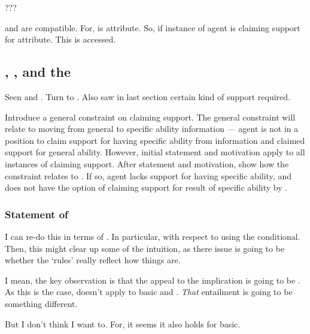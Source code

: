 \begin{note}[Summarising]
  ???
\end{note}

\begin{note}
  \AR{} and \ESU{} are compatible.
  For, \AR{} is attribute.
  So, if instance of \AR{} agent is claiming support for attribute.
  This is accessed.
\end{note}

\subsection{\nI{}, \gsi{}, and the \aben{}}
\label{sec:second-conditional}

\begin{note}
  Seen \ESU{} and \WR{}.
  Turn to \AR{}.
  Also saw in last section certain kind of support required.

  Introduce a general constraint on claiming support.
  The general constraint will relate to moving from general to specific ability information --- agent is not in a position to claim support for having specific ability from information and claimed support for general ability.
  However, initial statement and motivation apply to all instances of claiming support.
  After statement and motivation, show how the constraint relates to \AR{}.
  If so, agent lacks support for having specific ability, and does not have the option of claiming support for result of specific ability by \AR{}.
\end{note}

\subsubsection{Statement of \nI{}}
\label{sec:ni-1}

{
  \color{red}
  I can re-do this in terms of \nr{}.
  In particular, \nr{} with respect to using the conditional.
  Then, this might clear up some of the intuition, as there issue is going to be whether the `rules' really reflect how things are.

  I mean, the key observation is that the appeal to the implication is going to be \nr{}.
  As this is the case, \nI{} doesn't apply to basic\AR{} and \ur{}.
  \emph{That} entailment is going to be something different.

  But I don't think I want to.
  For, it seems it also holds for basic\AR{}.
}

